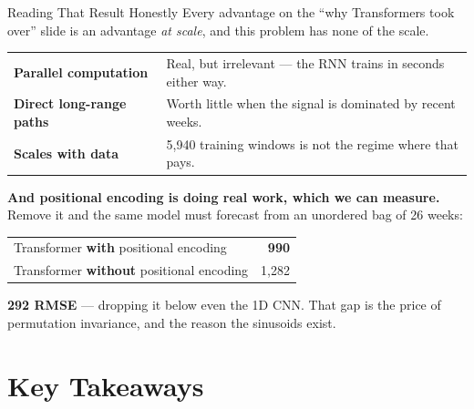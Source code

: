\documentclass[aspectratio=169, 11pt]{beamer}
\begin{document}
\begin{frame}{Reading That Result Honestly}
  Every advantage on the ``why Transformers took over'' slide is an advantage \emph{at scale}, and
  this problem has none of the scale.

  \vspace{0.1cm}
  \begin{center}
    {\small
    \begin{tabular}{p{4.3cm}p{8.2cm}}
      \toprule
      \textbf{Parallel computation} & Real, but irrelevant --- the RNN trains in seconds either way. \\[3pt]
      \textbf{Direct long-range paths} & Worth little when the signal is dominated by recent weeks. \\[3pt]
      \textbf{Scales with data} & 5{,}940 training windows is not the regime where that pays. \\
      \bottomrule
    \end{tabular}
    }
  \end{center}

  \vspace{-0.05cm}
  \textbf{And positional encoding is doing real work, which we can measure.} Remove it and the
  same model must forecast from an unordered bag of 26 weeks:
  \begin{center}
    {\small
    \begin{tabular}{lr}
      \toprule
      Transformer \textbf{with} positional encoding & \textbf{990} \\
      Transformer \textbf{without} positional encoding & 1{,}282 \\
      \bottomrule
    \end{tabular}
    }
  \end{center}

  \vspace{-0.05cm}
  \textbf{292 RMSE} --- dropping it below even the 1D CNN. That gap is the price of permutation
  invariance, and the reason the sinusoids exist.
\end{frame}

\section{Key Takeaways}
\end{document}
